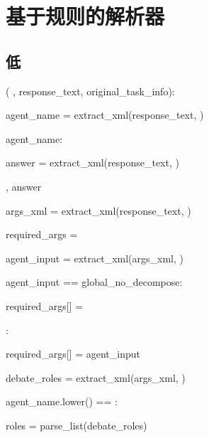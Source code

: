 \section{基于规则的解析器}
\label{app:parser}

\subsection{低 \masness}


\begin{subagent}[title=低 \masness 解析器]

  (
, response\_text, original\_task\_info):

\quad {}

\quad agent\_name = extract\_xml(response\_text, )

\quad {}  agent\_name:

\quad\quad {}

\quad\quad answer = extract\_xml(response\_text, )

\quad\quad {} , answer \\


\quad {}

\quad args\_xml = extract\_xml(response\_text, )

\quad required\_args = \code{\{\}} \\

\quad {}

\quad agent\_input = extract\_xml(args\_xml, )

\quad {} agent\_input ==   global\_no\_decompose:

\quad\quad required\_args[] = 

\quad {}:

\quad\quad required\_args[] = agent\_input \\


\quad {}

\quad debate\_roles = extract\_xml(args\_xml, )

\quad {} agent\_name.lower() == :

\quad\quad roles = parse\_list(debate\_roles)


\end{subagent}
